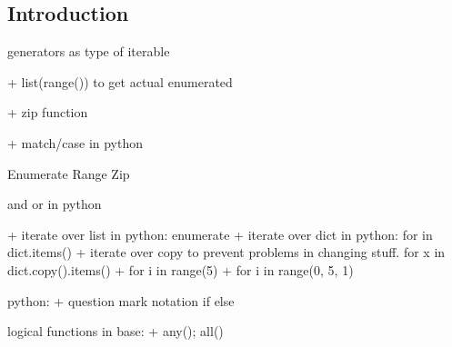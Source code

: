 
\subsection{Introduction}


generators as type of iterable

+ list(range()) to get actual enumerated

+ zip function

+ match/case in python

Enumerate
Range
Zip

and or in python

+ iterate over list in python: enumerate
+ iterate over dict in python: for in dict.items()
+ iterate over copy to prevent problems in changing stuff. for x in dict.copy().items()
+ for i in range(5)
+ for i in range(0, 5, 1)

python:
+ question mark notation if else


logical functions in base:
+ any(); all()
